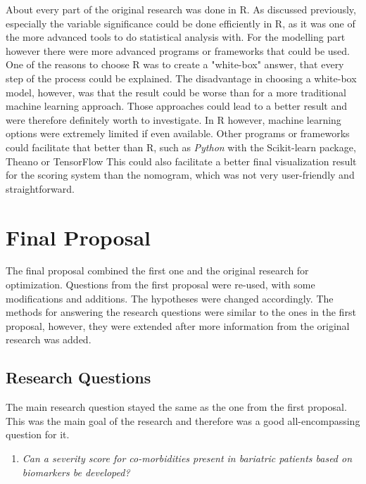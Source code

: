 \documentclass[10pt,a4paper]{report}
\begin{document}
	About every part of the original research was done in R. As discussed previously, especially the variable significance could be done efficiently in R, as it was one of the more advanced tools to do statistical analysis with. For the modelling part however there were more advanced programs or frameworks that could be used. One of the reasons to choose R was to create a "white-box" answer, that every step of the process could be explained. The disadvantage in choosing a white-box model, however, was that the result could be worse than for a more traditional machine learning approach. Those approaches could lead to a better result and were therefore definitely worth to investigate. In R however, machine learning options were extremely limited if even available. Other programs or frameworks could facilitate that better than R, such as \textit{Python} with the Scikit-learn package, Theano or TensorFlow This could also facilitate a better final visualization result for the scoring system than the nomogram, which was not very user-friendly and straightforward.
	
	\clearpage
	
	\section{Final Proposal}
	\label{sec:FinalProposal}
	
	The final proposal combined the first one and the original research for optimization. Questions from the first proposal were re-used, with some modifications and additions. The hypotheses were changed accordingly. The methods for answering the research questions were similar to the ones in the first proposal, however, they were extended after more information from the original research was added. 
	
	\subsection{Research Questions}
	
	The main research question stayed the same as the one from the first proposal. This was the main goal of the research and therefore was a good all-encompassing question for it. 
	
	\begin{enumerate}
		\item[] \emph{Can a severity score for co-morbidities present in bariatric patients based on biomarkers be developed?}
	\end{enumerate}
	
\end{document}
